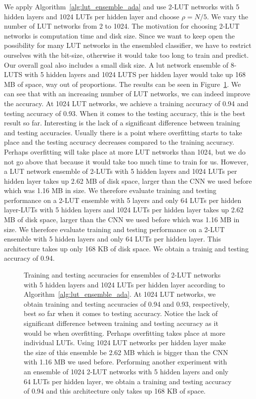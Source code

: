 We apply Algorithm~\ref{alg:lut_ensemble_ada} and use 2-LUT networks with 5 hidden layers and 1024 LUTs per hidden layer and choose $\rho = N/5$. We vary the number of LUT networks from 2 to 1024. The motivation for choosing 2-LUT networks is computation time and disk size. Since we want to keep open the possibility for many LUT networks in the ensembled classifier, we have to restrict ourselves with the bit-size, otherwise it would take too long to train and predict. Our overall goal also includes a small disk size. A lut network ensemble of 8-LUTS with 5 hidden layers and 1024 LUTS per hidden layer would take up 168 MB of space, way out of proportions. The results can be seen in Figure~\ref{fig:ada_2_LUT}. We can see that with an increasing number of LUT networks, we can indeed improve the accuracy. At 1024 LUT networks, we achieve a training accuracy of 0.94 and testing accuracy of 0.93. When it comes to the testing accuracy, this is the best result so far. Interesting is the lack of a significant difference between training and testing accuracies. Usually there is a point where overfitting starts to take place and the testing accuracy decreases compared to the training accuracy. Perhaps overfitting will take place at more LUT networks than 1024, but we do not go above that because it would take too much time to train for us. However, a LUT network ensemble of 2-LUTs with 5 hidden layers and 1024 LUTs per hidden layer takes up 2.62 MB of disk space, larger than the CNN we used before which was 1.16 MB in size. We therefore evaluate training and testing performance on a 2-LUT ensemble with 5 layers and only 64 LUTs per hidden layer-LUTs with 5 hidden layers and 1024 LUTs per hidden layer takes up 2.62 MB of disk space, larger than the CNN we used before which was 1.16 MB in size. We therefore evaluate training and testing performance on a 2-LUT ensemble with 5 hidden layers and only 64 LUTs per hidden layer. This architecture takes up only 168 KB of disk space. We obtain a trainig and testing accuracy of 0.94.

\begin{figure}[!htb]
    \centering
    
    \caption{Training and testing accuracies for ensembles of 2-LUT networks with 5 hidden layers and 1024 LUTs per hidden layer according to Algorithm~\ref{alg:lut_ensemble_ada}. At 1024 LUT networks, we obtain training and testing accuracies of 0.94 and 0.93, respectively, best so far when it comes to testing accuracy. Notice the lack of significant difference between training and testing accuracy as it would be when overfitting. Perhaps overfitting takes place at more individual LUTs. Using 1024 LUT networks per hidden layer make the size of this ensemble be 2.62 MB which is bigger than the CNN with 1.16 MB we used before. Performing another experiment with an ensemble of 1024 2-LUT networks with 5 hidden layers and only 64 LUTs per hidden layer, we obtain a training and testing accuracy of 0.94 and this architecture only takes up 168 KB of space.}
\label{fig:ada_2_LUT}
\end{figure}
\FloatBarrier

